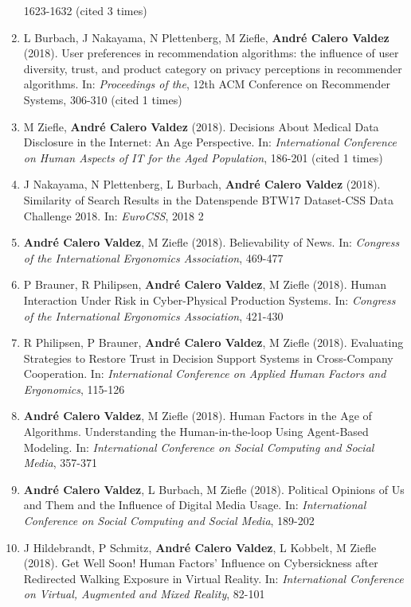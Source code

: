 \documentclass[11pt,a4paper,sans]{moderncv}
\begin{document}
\begin{enumerate}
  1623-1632 (cited 3 times)
\item
  L Burbach, J Nakayama, N Plettenberg, M Ziefle, \textbf{André Calero
  Valdez} (2018). User preferences in recommendation algorithms: the
  influence of user diversity, trust, and product category on privacy
  perceptions in recommender algorithms. In: \emph{Proceedings of the},
  12th ACM Conference on Recommender Systems, 306-310 (cited 1 times)
\item
  M Ziefle, \textbf{André Calero Valdez} (2018). Decisions About Medical
  Data Disclosure in the Internet: An Age Perspective. In:
  \emph{International Conference on Human Aspects of IT for the Aged
  Population}, 186-201 (cited 1 times)
\item
  J Nakayama, N Plettenberg, L Burbach, \textbf{André Calero Valdez}
  (2018). Similarity of Search Results in the Datenspende BTW17
  Dataset-CSS Data Challenge 2018. In: \emph{EuroCSS}, 2018 2
\item
  \textbf{André Calero Valdez}, M Ziefle (2018). Believability of News.
  In: \emph{Congress of the International Ergonomics Association},
  469-477
\item
  P Brauner, R Philipsen, \textbf{André Calero Valdez}, M Ziefle (2018).
  Human Interaction Under Risk in Cyber-Physical Production Systems. In:
  \emph{Congress of the International Ergonomics Association}, 421-430
\item
  R Philipsen, P Brauner, \textbf{André Calero Valdez}, M Ziefle (2018).
  Evaluating Strategies to Restore Trust in Decision Support Systems in
  Cross-Company Cooperation. In: \emph{International Conference on
  Applied Human Factors and Ergonomics}, 115-126
\item
  \textbf{André Calero Valdez}, M Ziefle (2018). Human Factors in the
  Age of Algorithms. Understanding the Human-in-the-loop Using
  Agent-Based Modeling. In: \emph{International Conference on Social
  Computing and Social Media}, 357-371
\item
  \textbf{André Calero Valdez}, L Burbach, M Ziefle (2018). Political
  Opinions of Us and Them and the Influence of Digital Media Usage. In:
  \emph{International Conference on Social Computing and Social Media},
  189-202
\item
  J Hildebrandt, P Schmitz, \textbf{André Calero Valdez}, L Kobbelt, M
  Ziefle (2018). Get Well Soon! Human Factors' Influence on
  Cybersickness after Redirected Walking Exposure in Virtual Reality.
  In: \emph{International Conference on Virtual, Augmented and Mixed
  Reality}, 82-101

\end{enumerate}
\end{document}
